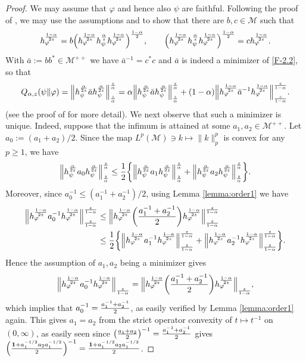 \documentclass[12pt]{article}
\theoremstyle{definition}
\theoremstyle{remark}
\numberwithin{equation}{section}
\def\cM{\mathcal M}
\def\Me{\mathcal M}
\def\ffi{\varphi}
\def\1{\mathbf{1}}
\begin{document}
\begin{proof} We may assume that $\varphi$ and hence also $\psi$ are faithful. Following
 the proof of \cite[Theorem 1(vi)]{kato2023onrenyi},  we may use the
assumptions and \cite[Lemma A.58]{hiai2021quantum} to show  that there are $b,c\in\cM$ such that
\begin{align}\label{eq:bc}
h_\ffi^{1-\alpha\over2z}
=b\Bigl(h_\ffi^{1-\alpha\over2z}h_\psi^{\alpha\over z}h_\ffi^{1-\alpha\over2z}\Bigr)^{1-\alpha\over2},\qquad
\Bigl(h_\ffi^{1-\alpha\over2z}h_\psi^{\alpha\over z}h_\ffi^{1-\alpha\over2z}\Bigr)^{1-\alpha\over2}
=ch_\ffi^{1-\alpha\over2z}.
\end{align}
With $\bar a:=bb^*\in\cM^{++}$ we have  $\bar a^{-1}=c^*c$ and $\bar a$ is indeed a minimizer of
\eqref{F-2.2}, so that
\begin{align}\label{eq:infimum}
Q_{\alpha,z}(\psi\|\ffi)
=\Big\|h_\psi^{\alpha\over2z}\bar ah_\psi^{\alpha\over2z}\Big\|_{z\over\alpha}^{z\over\alpha}
=\alpha\Big\|h_\psi^{\alpha\over2z}\bar ah_\psi^{\alpha\over2z}\Big\|_{z\over\alpha}^{z\over\alpha}
+(1-\alpha)\Big\|h_\ffi^{1-\alpha\over2z}\bar a^{-1}h_\ffi^{1-\alpha\over2z}\Big\|_{z\over
1-\alpha}^{z\over 1-\alpha}.
\end{align}
(see the proof of \cite[Theorem 1(vi)]{kato2023onrenyi} for more detail).
We next observe that such a minimizer is unique. Indeed, suppose that the infimum is
attained  at some $a_1,a_2\in \Me^{++}$. Let $a_0:=(a_1+a_2)/2$. Since the map 
$L^{p}(\cM)\ni k\mapsto\|k\|_{p}^{p}$ is convex for any $p\ge 1$, we have 
\[
\Big\|h_\psi^{\alpha\over2z}a_0h_\psi^{\alpha\over2z}\Big\|_{z\over\alpha}^{z\over\alpha}
\le{1\over2}\biggl\{\Big\|h_\psi^{\alpha\over2z}a_1
h_\psi^{\alpha\over2z}\Big\|_{z\over\alpha}^{z\over\alpha}
+\Big\|h_\psi^{\alpha\over2z}a_2h_\psi^{\alpha\over2z}\Big\|_{z\over\alpha}^{z\over\alpha}\biggr\}.
\]
Moreover, {since $a_0^{-1}\le(a_1^{-1}+a_2^{-1})/2$}, using Lemma \ref{lemma:order1}
we have
\begin{align*}
\Big\|h_\ffi^{1-\alpha\over2z}a_0^{-1}h_\ffi^{1-\alpha\over2z}\Big\|_{z\over1-\alpha}^{z\over1-\alpha}
&\le\Big\|h_\ffi^{1-\alpha\over2z}\biggl({a_1^{-1}+a_2^{-1}\over2}\biggr)
h_\ffi^{1-\alpha\over2z}\Big\|_{z\over1-\alpha}^{z\over1-\alpha} \\
&\le{1\over2}\biggl\{\Big\|h_\ffi^{1-\alpha\over2z}a_1^{-1}
h_\ffi^{1-\alpha\over2z}\Big\|_{z\over1-\alpha}^{z\over1-\alpha}
+\Big\|h_\ffi^{1-\alpha\over2z}a_2^{-1}
h_\ffi^{1-\alpha\over2z}\Big\|_{z\over1-\alpha}^{z\over1-\alpha}\biggr\}.
\end{align*}
Hence the assumption of $a_1,a_2$ being a minimizer gives
\[
\Big\|h_\ffi^{1-\alpha\over2z}a_0^{-1}h_\ffi^{1-\alpha\over2z}\Big\|_{z\over1-\alpha}
=\Big\|h_\ffi^{1-\alpha\over2z}\biggl({a_1^{-1}+a_2^{-1}\over2}\biggr)
h_\ffi^{1-\alpha\over2z}\Big\|_{z\over1-\alpha},
\]
which implies that $a_0^{-1}={a_1^{-1}+a_2^{-1}\over2}$, as easily verified by Lemma \ref{lemma:order1}
again. This gives $a_1=a_2$ from the strict operator convexity of $t\mapsto t^{-1}$ on
$(0,\infty)$, as easily seen since $\bigl({a_1+a_2\over2}\bigr)^{-1}={a_1^{-1}+a_2^{-1}\over2}$ gives
$\Bigl({\1+a_1^{-1/2}a_2a_1^{-1/2}\over2}\Bigr)^{-1}={\1+a_1^{-1/2}a_2a_1^{-1/2}\over2}$.


\end{proof}
\end{document}
